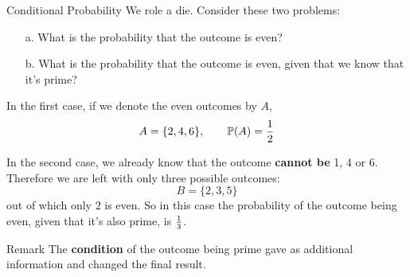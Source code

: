 \documentclass{beamer}
\newcommand{\PP}{\mathbb{P}}
\begin{document}
















\begin{frame}{Conditional Probability}
    We role a die. Consider these two problems:\pause
    \begin{enumerate}
        \item[a. ] What is the probability that the outcome is even?
        \item[b. ] What is the probability that the outcome is even, given that we know that it's prime?
    \end{enumerate}
    \pause In the first case, if we denote the even outcomes by $A$,
    \[A=\{2, 4 ,6\},\qquad \PP(A)={1\over 2}\]
    
    \pause In the second case, we already know that the outcome \textbf{cannot be} 1, 4 or 6. Therefore we are left with only three possible outcomes:
    \[B=\{2,3,5\}\]
    out of which only $2$ is even. \pause So in this case the probability of the outcome being even, given that it's also prime, is $1\over 3$.
   \begin{block}{Remark}
       The \textbf{condition} of the outcome being prime gave as additional information and changed the final result.
   \end{block}
    
\end{frame}
\end{document}
